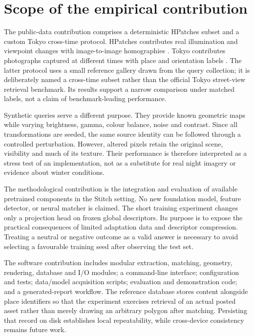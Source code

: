 \section{Scope of the empirical contribution}
The public-data contribution comprises a deterministic HPatches subset and a custom Tokyo cross-time protocol. HPatches contributes real illumination and viewpoint changes with image-to-image homographies \citep{balntas2017}. Tokyo contributes photographs captured at different times with place and orientation labels \citep{torii2015}. The latter protocol uses a small reference gallery drawn from the query collection; it is deliberately named a cross-time subset rather than the official Tokyo street-view retrieval benchmark. Its results support a narrow comparison under matched labels, not a claim of benchmark-leading performance.

Synthetic queries serve a different purpose. They provide known geometric maps while varying brightness, gamma, colour balance, noise and contrast. Since all transformations are seeded, the same source identity can be followed through a controlled perturbation. However, altered pixels retain the original scene, visibility and much of its texture. Their performance is therefore interpreted as a stress test of an implementation, not as a substitute for real night imagery or evidence about winter conditions.

The methodological contribution is the integration and evaluation of available pretrained components in the Stitch setting. No new foundation model, feature detector, or neural matcher is claimed. The short training experiment changes only a projection head on frozen global descriptors. Its purpose is to expose the practical consequences of limited adaptation data and descriptor compression. Treating a neutral or negative outcome as a valid answer is necessary to avoid selecting a favourable training seed after observing the test set.

The software contribution includes modular extraction, matching, geometry, rendering, database and I/O modules; a command-line interface; configuration and tests; data/model acquisition scripts; evaluation and demonstration code; and a generated-report workflow. The reference database stores content alongside place identifiers so that the experiment exercises retrieval of an actual posted asset rather than merely drawing an arbitrary polygon after matching. Persisting that record on disk establishes local repeatability, while cross-device consistency remains future work.

